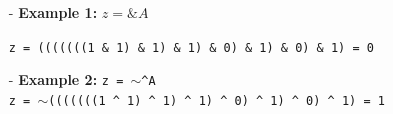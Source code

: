 \documentclass[12pt,openany]{book}
\begin{document}
\begin{itemize}
    \item[-] \textbf{Example 1:} \( z = \&A \)

\texttt{z = (((((((1 \& 1) \& 1) \& 1) \& 0) \& 1) \& 0) \& 1) = 0}
    \item[-] \textbf{Example 2:} \texttt{z = \texttt{$\sim$}\texttt{\^}A} \\

\texttt{z = \texttt{$\sim$}(((((((1 \texttt{\^} 1) \texttt{\^} 1) \texttt{\^} 1) \texttt{\^} 0) \texttt{\^} 1) \texttt{\^} 0) \texttt{\^} 1) = 1  \\}

\end{itemize}
\end{document}
